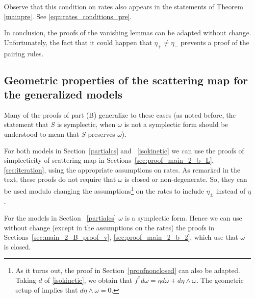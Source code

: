\documentclass[11pt]{amsart}
\theoremstyle{definition}
\theoremstyle{remark}
\numberwithin{equation}{section}
\begin{document}
Observe that this condition on rates also appears  in the statements of Theorem \ref{mainpre}. See \eqref{eqn:rates_conditions_pre}.


In conclusion, the proofs of the vanishing lemmas can be adapted
without  change. Unfortunately,
the fact that it could happen that $\eta_+ \ne \eta_-$ prevents a proof of the
pairing rules.



\subsection{Geometric properties of the scattering map for the generalized models}
\label{newscattering}
Many of the proofs of part (B)
generalize to these cases (as noted before, the statement  that $S$ is symplectic,
when $\omega$ is not a symplectic form should be understood to mean that $S$
preserves $\omega$).


For both  models in Section~\ref{partialcs} and ~\ref{isokinetic}
we can use the proofs of simplecticity of
scattering map in Sections~\ref{sec:proof_main_2_b_L}, \ref{sec:iteration},
using the appropriate assumptions on rates. As remarked in the text,
these proofs do not require that $\omega$ is closed or non-degenerate.
So, they can be used modulo changing the assumptions\footnote{
As it turns out, the proof in Section~\ref{proofnonclosed} can also
be adapted. Taking $d$ of \eqref{isokinetic}, we obtain that
$f^* d \omega = \eta d\omega + d\eta \wedge \omega$.
The geometric setup of \cite{wojtkowski1998conformally}
implies that $ d\eta \wedge \omega = 0$.} on the rates
to include $\eta_\pm$ instead of $\eta$.


For the  models in Section ~\ref{partialcs} $\omega$ is a symplectic form.
Hence we can use without change (except in the assumptions on
 the rates) the proofs
in Sections~\ref{sec:main_2_B_proof_v}, \ref{sec:proof_main_2_b_2},
which  use that $\omega$ is closed.





\end{document}
